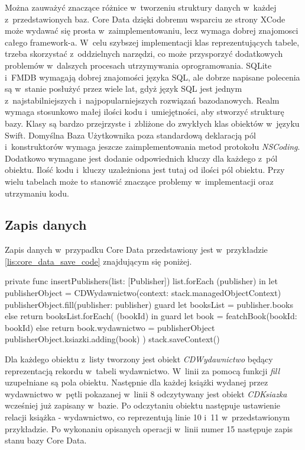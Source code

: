 Można zauważyć znaczące różnice w~tworzeniu struktury danych w~każdej z~przedstawionych baz. Core Data dzięki dobremu wsparciu ze strony XCode może wydawać się prosta w~zaimplementowaniu, lecz wymaga dobrej znajomosci całego framework-a. W~celu szybszej implementacji klas reprezentujących tabele, trzeba skorzystać z~oddzielnych narzędzi, co może przysporzyć dodatkowych problemów w~dalszych procesach utrzymywania oprogramowania. SQLite i~FMDB wymagają dobrej znajomości języka SQL, ale dobrze napisane polecenia są w~stanie posłużyć przez wiele lat, gdyż język SQL jest jednym z~najstabilniejszych i~najpopularniejszych rozwiązań bazodanowych. Realm wymaga stosunkowo małej ilości kodu i~umiejętności, aby stworzyć strukturę bazy. Klasy są bardzo przejrzyste i~zbliżone do zwykłych klas obiektów w~języku Swift. Domyślna Baza Użytkownika poza standardową deklaracją pól i~konstruktorów wymaga jeszcze zaimplementowania metod protokołu \textit{NSCoding}. Dodatkowo wymagane jest dodanie odpowiednich kluczy dla każdego z~pól obiektu. Ilość kodu i~kluczy uzależniona jest tutaj od ilości pól obiektu. Przy wielu tabelach może to stanowić znaczące problemy w~implementacji oraz utrzymaniu kodu. 

\subsection{Zapis danych}

Zapis danych w~przypadku Core Data przedstawiony jest w~przykładzie \ref{lis:core_data_save_code} znajdującym się poniżej.

\begin{code}[
		language=swift,
		caption={Przykład zapisu obiektu Core Data},
		label={lis:core_data_save_code},
	]
    private func insertPublishers(list: [Publisher]) {
        list.forEach { (publisher) in
            let publisherObject = CDWydawnictwo(context: stack.managedObjectContext)
            publisherObject.fill(publisher: publisher)
            guard let booksList = publisher.books else { return }
            booksList.forEach({ (bookId) in
                guard let book = featchBook(bookId: bookId) else { return }
                book.wydawnictwo = publisherObject
                publisherObject.ksiazki.adding(book)
            })
        }
        stack.saveContext()
    }
\end{code}
\bigskip

Dla każdego obiektu z~listy tworzony jest obiekt \textit{CDWydawnictwo} będący reprezentacją rekordu w~tabeli wydawnictwo. W~linii za pomocą funkcji \textit{fill} uzupełniane są pola obiektu. Następnie dla każdej książki wydanej przez wydawnictwo w~pętli pokazanej w~linii 8 odczytywany jest obiekt \textit{CDKsiazka} wcześniej już zapisany w~bazie. Po odczytaniu obiektu następuje ustawienie relacji książka - wydawnictwo, co reprezentują linie 10 i~11 w~przedstawionym przykładzie. Po wykonaniu opisanych operacji w~linii numer 15 następuje zapis stanu bazy Core Data. 

